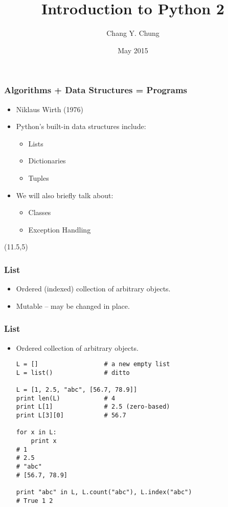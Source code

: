 \documentclass{beamer}
\begin{document}
\title{Introduction to Python 2}
\date{May 2015}
\author{Chang Y. Chung}

{
\begin{frame}[noframenumbering]
\titlepage
\end{frame}}

\begin{frame}[fragile]
\frametitle{Algorithms + Data Structures = Programs}
\begin{itemize}
\item<1-> Niklaus Wirth (1976)\cite{Wirth1976}
\item<2-> Python's built-in data structures include:
\begin{itemize}
  \item Lists
  \item Dictionaries
  \item Tuples
\end{itemize}
\item<3-> We will also briefly talk about:
\begin{itemize}
  \item Classes
  \item Exception Handling
\end{itemize}
\end{itemize}

\begin{textblock}{5}(11.5,5)
\end{textblock}
\end{frame}

\begin{frame}[fragile]
\frametitle{List}
\begin{itemize}
\item Ordered (indexed) collection of arbitrary objects.
\item Mutable -- may be changed in place.
\end{itemize}
\end{frame}

\begin{frame}[fragile]
\frametitle{List}
\begin{itemize}
\item Ordered collection of arbitrary objects.
\begin{lstlisting}[escapechar=\%]
L = []                  # a new empty list
L = list()              # ditto

L = [1, 2.5, "abc", [56.7, 78.9]]
print len(L)            # 4
print L[1]              # 2.5 (zero-based)
print L[3][0]           # 56.7

for x in L:
    print x
# 1
# 2.5
# "abc"
# [56.7, 78.9]

print "abc" in L, L.count("abc"), L.index("abc")
# True 1 2
\end{lstlisting}
\end{itemize}
\end{frame}
\end{document}
